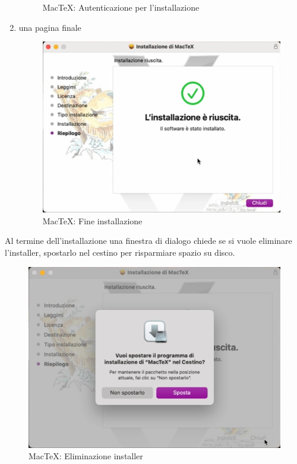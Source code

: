 \documentclass[envcountsame,envcountchap]{svmono}
\begin{document}
\begin{enumerate}
\begin{figure}[H]
            \caption{MacTeX: Autenticazione per l'installazione}
            \label{mactex_install_auth}
        \end{figure}
    \item una pagina finale
        \begin{figure}[H]
            \centering
            \includegraphics[width=0.5\linewidth]{images/texlive/mac/7_fine_installazione.png}
            \caption{MacTeX: Fine installazione}
            \label{mactex_fine_inst}
        \end{figure}
\end{enumerate}

Al termine dell'installazione una finestra di dialogo chiede se si vuole eliminare l'installer,
spostarlo nel cestino per risparmiare spazio su disco.

\begin{figure}[H]
    \centering
    \includegraphics[width=0.9\linewidth]{images/texlive/mac/8_eliminazione_installer.png}
    \caption{MacTeX: Eliminazione installer}
    \label{mactex_eliminazione_installer}
\end{figure}
\end{document}
